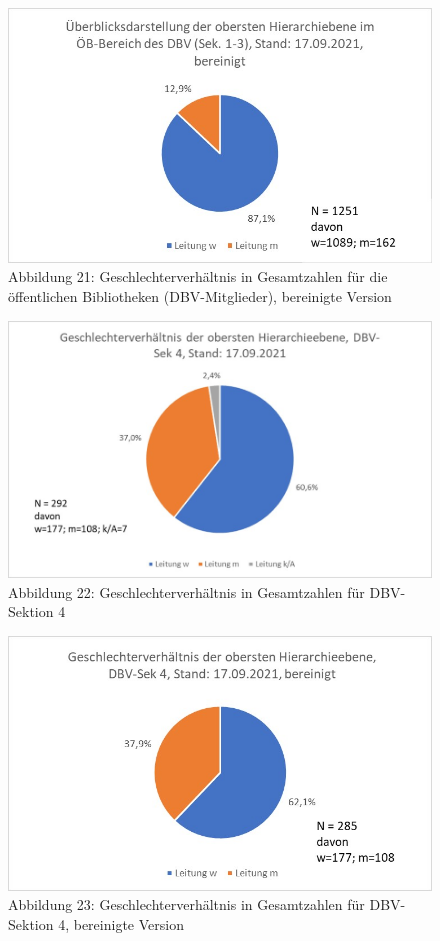 \documentclass[a4paper,
fontsize=11pt,
oneside,
numbers=noperiodatend,
parskip=half-,
bibliography=totoc,
final
]{scrartcl}
\begin{document}
\begin{figure}
\centering
\includegraphics{img/Abb.21_DBV-Sek1-3_gesamt_bereinigt.jpg}
\caption{Abbildung 21: Geschlechterverhältnis in Gesamtzahlen für die
öffentlichen Bibliotheken (DBV-Mitglieder), bereinigte Version}
\end{figure}

\begin{figure}
\centering
\includegraphics{img/Abb.22_DBV-Sek4_gesamt.jpg}
\caption{Abbildung 22: Geschlechterverhältnis in Gesamtzahlen für
DBV-Sektion 4}
\end{figure}

\begin{figure}
\centering
\includegraphics{img/Abb.23_DBV-Sek4_gesamt_bereinigt.jpg}
\caption{Abbildung 23: Geschlechterverhältnis in Gesamtzahlen für
DBV-Sektion 4, bereinigte Version}
\end{figure}
\end{document}
